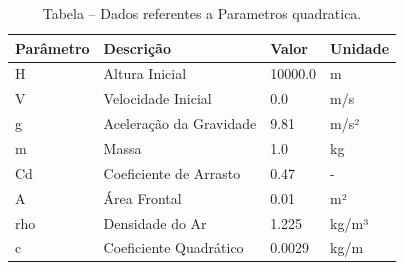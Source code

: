 \begin{table}[H]
\centering
\caption{Tabela – Dados referentes a Parametros quadratica.}
\label{tab:parametros_quadratica}
\begin{tabular}{llll}
\toprule
Parâmetro & Descrição & Valor & Unidade \\
\midrule
H & Altura Inicial & 10000.0 & m \\
V & Velocidade Inicial & 0.0 & m/s \\
g & Aceleração da Gravidade & 9.81 & m/s² \\
m & Massa & 1.0 & kg \\
Cd & Coeficiente de Arrasto & 0.47 & - \\
A & Área Frontal & 0.01 & m² \\
rho & Densidade do Ar & 1.225 & kg/m³ \\
c & Coeficiente Quadrático & 0.0029 & kg/m \\
\bottomrule
\end{tabular}

\end{table}
